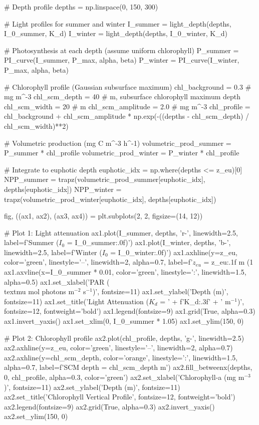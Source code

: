 \documentclass[a4paper, 11pt]{article}
\begin{document}
\begin{pycode}
# Depth profile
depths = np.linspace(0, 150, 300)

# Light profiles for summer and winter
I_summer = light_depth(depths, I_0_summer, K_d)
I_winter = light_depth(depths, I_0_winter, K_d)

# Photosynthesis at each depth (assume uniform chlorophyll)
P_summer = PI_curve(I_summer, P_max, alpha, beta)
P_winter = PI_curve(I_winter, P_max, alpha, beta)

# Chlorophyll profile (Gaussian subsurface maximum)
chl_background = 0.3  # mg m^-3
chl_scm_depth = 40  # m, subsurface chlorophyll maximum depth
chl_scm_width = 20  # m
chl_scm_amplitude = 2.0  # mg m^-3
chl_profile = chl_background + chl_scm_amplitude * np.exp(-((depths - chl_scm_depth) / chl_scm_width)**2)

# Volumetric production (mg C m^-3 h^-1)
volumetric_prod_summer = P_summer * chl_profile
volumetric_prod_winter = P_winter * chl_profile

# Integrate to euphotic depth
euphotic_idx = np.where(depths <= z_eu)[0]
NPP_summer = trapz(volumetric_prod_summer[euphotic_idx], depths[euphotic_idx])
NPP_winter = trapz(volumetric_prod_winter[euphotic_idx], depths[euphotic_idx])

fig, ((ax1, ax2), (ax3, ax4)) = plt.subplots(2, 2, figsize=(14, 12))

# Plot 1: Light attenuation
ax1.plot(I_summer, depths, 'r-', linewidth=2.5, label=f'Summer ($I_0$ = {I_0_summer:.0f})')
ax1.plot(I_winter, depths, 'b-', linewidth=2.5, label=f'Winter ($I_0$ = {I_0_winter:.0f})')
ax1.axhline(y=z_eu, color='green', linestyle='--', linewidth=2, alpha=0.7,
            label=f'$z_{{eu}}$ = {z_eu:.1f} m (1\\%
ax1.axvline(x=I_0_summer * 0.01, color='green', linestyle=':', linewidth=1.5, alpha=0.5)
ax1.set_xlabel('PAR (\\textmu mol photons m$^{-2}$ s$^{-1}$)', fontsize=11)
ax1.set_ylabel('Depth (m)', fontsize=11)
ax1.set_title('Light Attenuation ($K_d$ = ' + f'{K_d:.3f}' + ' m$^{-1}$)', fontsize=12, fontweight='bold')
ax1.legend(fontsize=9)
ax1.grid(True, alpha=0.3)
ax1.invert_yaxis()
ax1.set_xlim(0, I_0_summer * 1.05)
ax1.set_ylim(150, 0)

# Plot 2: Chlorophyll profile
ax2.plot(chl_profile, depths, 'g-', linewidth=2.5)
ax2.axhline(y=z_eu, color='green', linestyle='--', linewidth=2, alpha=0.7)
ax2.axhline(y=chl_scm_depth, color='orange', linestyle=':', linewidth=1.5, alpha=0.7,
            label=f'SCM depth = {chl_scm_depth} m')
ax2.fill_betweenx(depths, 0, chl_profile, alpha=0.3, color='green')
ax2.set_xlabel('Chlorophyll-a (mg m$^{-3}$)', fontsize=11)
ax2.set_ylabel('Depth (m)', fontsize=11)
ax2.set_title('Chlorophyll Vertical Profile', fontsize=12, fontweight='bold')
ax2.legend(fontsize=9)
ax2.grid(True, alpha=0.3)
ax2.invert_yaxis()
ax2.set_ylim(150, 0)


\end{pycode}
\end{document}
